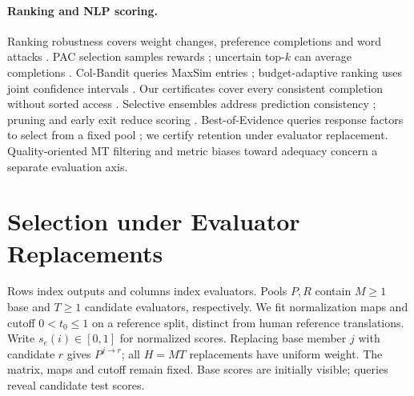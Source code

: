 \documentclass[11pt]{article}
\begin{document}
\paragraph{Ranking and NLP scoring.}
Ranking robustness covers weight changes, preference completions and word attacks \citep{asudeh2018stable,imber2020topk,wu2022certdr}. PAC selection samples rewards \citep{kalyanakrishnan2012pac}; uncertain top-$k$ can average completions \citep{amarilli2017topk}. Col-Bandit queries MaxSim entries \citep{pony2026colbanditquerytimetopkestimation}; budget-adaptive ranking uses joint confidence intervals \citep{oettershagen2026topkbudgetadaptiveranking}. Our certificates cover every consistent completion without sorted access \citep{fagin2003optimal}. Selective ensembles address prediction consistency \citep{black2022selective}; pruning and early exit reduce scoring \citep{li2022pruning,inoue2019ensemble,busolin2021exit}. Best-of-Evidence queries response factors to select from a fixed pool \citep{zhang2026bestofevidencebestofnselectionpartial}; we certify retention under evaluator replacement. Quality-oriented MT filtering \citep{perrella-etal-2024-beyond} and metric biases toward adequacy \citep{shayegh-etal-2025-feeding} concern a separate evaluation axis.

\section{Selection under Evaluator Replacements}
\label{sec:setting}
Rows index outputs and columns index evaluators. Pools $P,R$ contain $M\ge1$ base and $T\ge1$ candidate evaluators, respectively. We fit normalization maps and cutoff $0<t_0\le1$ on a reference split, distinct from human reference translations. Write $s_e(i)\in[0,1]$ for normalized scores. Replacing base member $j$ with candidate $r$ gives $P^{j\to r}$; all $H=MT$ replacements have uniform weight. The matrix, maps and cutoff remain fixed. Base scores are initially visible; queries reveal candidate test scores.
\end{document}
